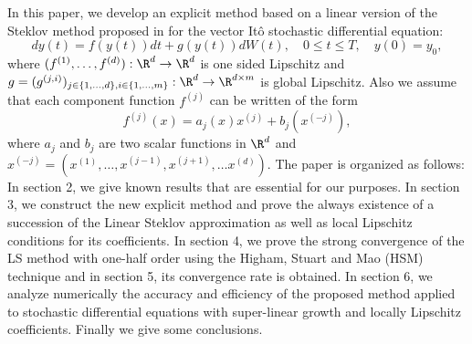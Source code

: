 In this paper, we develop an explicit method based on a linear version  of the Steklov method proposed 
in  \cite{Diaz-Infante2015}  for the  vector It\^o stochastic differential equation:
\begin{equation}\label{eqn:SDE1}
	dy(t)
	 =f(y(t))dt + g(y(t))dW(t), \quad 0\leq t\leq T,
	\quad y(0)=y_0,
\end{equation}
where $(f^{(1)},\dots, f^{(d)}):\R^d \to \R^d$ is one sided Lipschitz and 
$g = (g^{(j,i)})_{j\in \{1,\dots,d\}, i\in\{1,\dots, m\}}:\R^d \to \R^{d\times m}$ is global Lipschitz. 
Also we assume 
that  each component function $f^{(j)}$  can be written of the form
\begin{equation}\label{eqn:AlternativeConstruction}
	f^{(j)}(x) = a_j(x) x^{(j)} + b_j (x^{(-j)}), 
\end{equation}
where $a_j$ and	$b_{j}$ are two scalar 	functions in  $\R^d$ 
and $x^{(-j)} = \left( x^{(1)},\dots,x^{(j-1)},x^{(j+1)},\dots x^{(d)}\right)$. 
The paper is organized as follows: In section 2, we give known results that are essential
for our purposes. In section 3, we construct the new explicit method and prove  
 the always existence of a succession of the Linear Steklov  approximation as well as 
  local Lipschitz conditions for its coefficients.  
  In section 4, we prove the strong convergence of the LS method 
with one-half order using the Higham, Stuart and 
Mao (HSM) technique and in section 5, its  convergence rate is obtained. 
In section 6, we analyze numerically  the accuracy and efficiency of the proposed method 
applied to stochastic  differential equations with super-linear growth and locally Lipschitz coefficients. 
Finally we give some conclusions.

